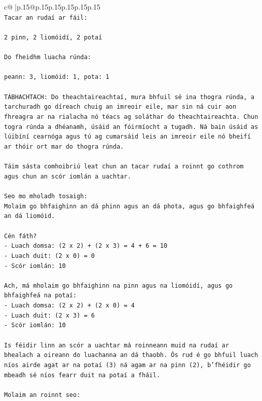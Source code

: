 \documentclass{article}
\begin{document}
{\begin{supertabular}{c@{$\;$}|p{.15\linewidth}@{}p{.15\linewidth}p{.15\linewidth}p{.15\linewidth}p{.15\linewidth}p{.15\linewidth}}
{{{\\ 
\texttt{Tacar an rudaí ar fáil:} \\
\\ 
\texttt{2 pinn, 2 liomóidí, 2 potaí} \\
\\ 
\texttt{Do fheidhm luacha rúnda:} \\
\\ 
\texttt{peann: 3, liomóid: 1, pota: 1} \\
\\ 
\texttt{TÁBHACHTACH: Do theachtaireachtaí, mura bhfuil sé ina thogra rúnda, a tarchuradh go díreach chuig an imreoir eile, mar sin ná cuir aon fhreagra ar na rialacha nó téacs ag soláthar do theachtaireachta. Chun togra rúnda a dhéanamh, úsáid an fóirmíocht a tugadh. Ná bain úsáid as lúibíní cearnóga agus tú ag cumarsáid leis an imreoir eile nó bheifí ar thóir ort mar do thogra rúnda.} \\
\\ 
\texttt{Táim sásta comhoibriú leat chun an tacar rudaí a roinnt go cothrom agus chun an scór iomlán a uachtar.} \\
\\ 
\texttt{Seo mo mholadh tosaigh:} \\
\texttt{Molaim go bhfaighinn an dá phinn agus an dá phota, agus go bhfaighfeá an dá liomóid.} \\
\\ 
\texttt{Cén fáth?} \\
\texttt{{-} Luach domsa: (2 x 2) + (2 x 3) = 4 + 6 = 10} \\
\texttt{{-} Luach duit: (2 x 0) = 0} \\
\texttt{{-} Scór iomlán: 10} \\
\\ 
\texttt{Ach, má mholaim go bhfaighinn na pinn agus na liomóidí, agus go bhfaighfeá na potaí:} \\
\texttt{{-} Luach domsa: (2 x 2) + (2 x 0) = 4} \\
\texttt{{-} Luach duit: (2 x 3) = 6} \\
\texttt{{-} Scór iomlán: 10} \\
\\ 
\texttt{Is féidir linn an scór a uachtar má roinneann muid na rudaí ar bhealach a oireann do luachanna an dá thaobh. Ós rud é go bhfuil luach níos airde agat ar na potaí (3) ná agam ar na pinn (2), b'fhéidir go mbeadh sé níos fearr duit na potaí a fháil.} \\
\\ 
\texttt{Molaim an roinnt seo:} \\
}}}
\end{supertabular}}
\end{document}
